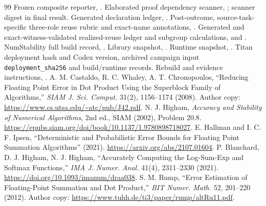 \documentclass[10pt,a4paper]{article}
\begin{document}
\begin{thebibliography}{99}
 Frozen composite reporter, .
 Elaborated proof dependency scanner, ; scanner digest in final result.
 Generated declaration ledger, .
 Post-outcome, source-task-specific three-role reuse rubric and exact-name annotations, .
 Generated and exact-witness-validated realized-reuse ledger and subgroup calculations,  and .
 NumStability full build record, .
 Library snapshot, .
 Runtime snapshot, .
 Titan deployment hash and Codex version, archived campaign input \texttt{deployment\_sha256} and build/runtime records.
 Rebuild and evidence instructions, .
 A. M. Castaldo, R. C. Whaley, A. T. Chronopoulos, ``Reducing Floating Point Error in Dot Product Using the Superblock Family of Algorithms,'' \emph{SIAM J. Sci. Comput.} 31(2), 1156--1174 (2008). Author copy: \url{https://www.cs.utsa.edu/~atc/pub/J42.pdf}.
 N. J. Higham, \emph{Accuracy and Stability of Numerical Algorithms}, 2nd ed., SIAM (2002), Problem 20.8. \url{https://epubs.siam.org/doi/book/10.1137/1.9780898718027}.
 E. Hallman and I. C. F. Ipsen, ``Deterministic and Probabilistic Error Bounds for Floating Point Summation Algorithms'' (2021). \url{https://arxiv.org/abs/2107.01604}.
 P. Blanchard, D. J. Higham, N. J. Higham, ``Accurately Computing the Log-Sum-Exp and Softmax Functions,'' \emph{IMA J. Numer. Anal.} 41(4), 2311--2330 (2021). \url{https://doi.org/10.1093/imanum/draa038}.
 S. M. Rump, ``Error Estimation of Floating-Point Summation and Dot Product,'' \emph{BIT Numer. Math.} 52, 201--220 (2012). Author copy: \url{https://www.tuhh.de/ti3/paper/rump/altRu11.pdf}.
\end{thebibliography}
\end{document}
